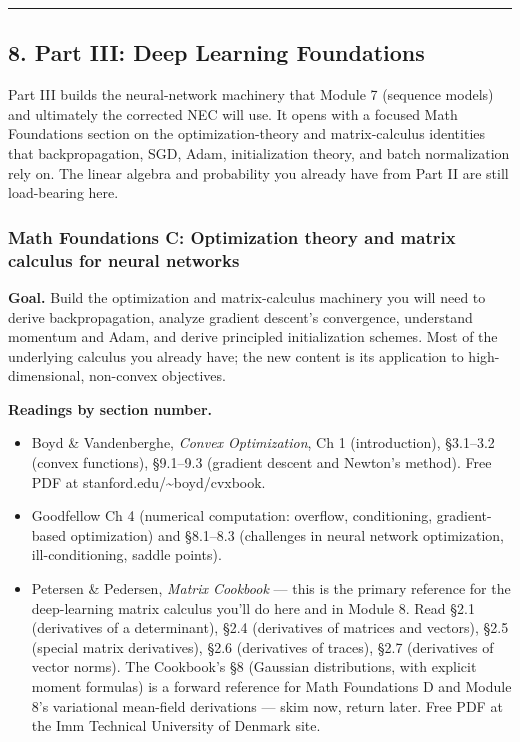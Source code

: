 \begin{center}\rule{0.5\linewidth}{0.5pt}\end{center}

\subsection{8. Part III: Deep Learning
Foundations}\label{part-iii-deep-learning-foundations}

Part III builds the neural-network machinery that Module 7 (sequence
models) and ultimately the corrected NEC will use. It opens with a
focused Math Foundations section on the optimization-theory and
matrix-calculus identities that backpropagation, SGD, Adam,
initialization theory, and batch normalization rely on. The linear
algebra and probability you already have from Part II are still
load-bearing here.

\subsubsection{Math Foundations C: Optimization theory and matrix
calculus for neural
networks}\label{math-foundations-c-optimization-theory-and-matrix-calculus-for-neural-networks}

\textbf{Goal.} Build the optimization and matrix-calculus machinery you
will need to derive backpropagation, analyze gradient descent's
convergence, understand momentum and Adam, and derive principled
initialization schemes. Most of the underlying calculus you already
have; the new content is its application to high-dimensional, non-convex
objectives.

\textbf{Readings by section number.}

\begin{itemize}
\tightlist
\item
  Boyd \& Vandenberghe, \emph{Convex Optimization}, Ch 1 (introduction),
  §3.1--3.2 (convex functions), §9.1--9.3 (gradient descent and Newton's
  method). Free PDF at stanford.edu/\textasciitilde boyd/cvxbook.
\item
  Goodfellow Ch 4 (numerical computation: overflow, conditioning,
  gradient-based optimization) and §8.1--8.3 (challenges in neural
  network optimization, ill-conditioning, saddle points).
\item
  Petersen \& Pedersen, \emph{Matrix Cookbook} --- this is the primary
  reference for the deep-learning matrix calculus you'll do here and in
  Module 8. Read §2.1 (derivatives of a determinant), §2.4 (derivatives
  of matrices and vectors), §2.5 (special matrix derivatives), §2.6
  (derivatives of traces), §2.7 (derivatives of vector norms). The
  Cookbook's §8 (Gaussian distributions, with explicit moment formulas)
  is a forward reference for Math Foundations D and Module 8's
  variational mean-field derivations --- skim now, return later. Free
  PDF at the Imm Technical University of Denmark site.
\end{itemize}

